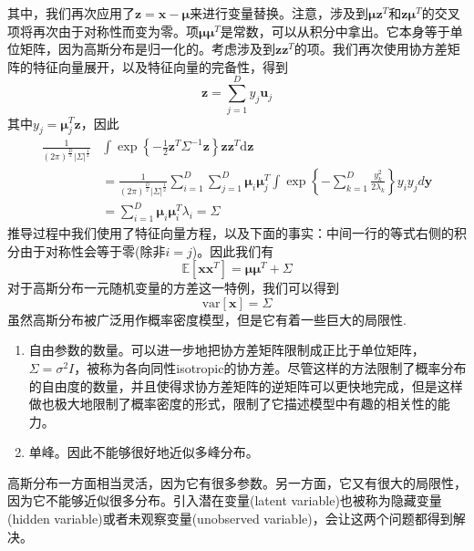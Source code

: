其中，我们再次应用了$\boldsymbol{z}=\boldsymbol{x}-\boldsymbol{\mu}$来进行变量替换。注意，涉及到$\boldsymbol{\mu z}^T$和$\boldsymbol{z\mu}^T$的交叉项将再次由于对称性而变为零。项$\boldsymbol{\mu \mu}^T$是常数，可以从积分中拿出。它本身等于单位矩阵，因为高斯分布是归一化的。考虑涉及到$\boldsymbol{zz}^T$的项。我们再次使用协方差矩阵的特征向量展开，以及特征向量的完备性，得到
\begin{equation}
	\boldsymbol{z}=\sum_{j=1}^{D}y_j\boldsymbol{u}_j
\end{equation}
其中$y_j=\boldsymbol{\mu}_j^T\boldsymbol{z}$，因此
\begin{equation}
\begin{aligned}
	\frac{1}{(2\pi)^{\frac{D}{2}}|\Sigma|^{\frac{1}{2}}}&\int\exp\left\{-\frac{1}{2}\boldsymbol{z}^T\Sigma^{-1}\boldsymbol{z} \right\}\boldsymbol{zz}^T\mathrm{d}\boldsymbol{z}\\
	&=\frac{1}{(2\pi)^{\frac{D}{2}}|\Sigma|^{\frac{1}{2}}}\sum_{i=1}^{D}\sum_{j=1}^{D}\boldsymbol{\mu}_i\boldsymbol{\mu}_j^T\int \exp\left\{-\sum_{k=1}^{D}\frac{y_k^2}{2\lambda_k} \right\}y_iy_jd\boldsymbol{y}\\
	&=\sum_{i=1}^{D}\boldsymbol{\mu}_i\boldsymbol{\mu}_i^T\lambda_i=\Sigma
\end{aligned}
\end{equation}
推导过程中我们使用了特征向量方程，以及下面的事实：中间一行的等式右侧的积分由于对称性会等于零(除非$i=j$)。因此我们有
\begin{equation}
	\mathbb{E}[\boldsymbol{xx}^T]=\boldsymbol{\mu\mu}^T+\Sigma
\end{equation}
对于高斯分布一元随机变量的方差这一特例，我们可以得到
\begin{equation}
	\mathrm{var}[\boldsymbol{x}]=\Sigma
\end{equation}
虽然高斯分布被广泛用作概率密度模型，但是它有着一些巨大的局限性.
\begin{enumerate}
	\item 自由参数的数量。可以进一步地把协方差矩阵限制成正比于单位矩阵，$\Sigma=\sigma^2I$，被称为各向同性isotropic的协方差。尽管这样的方法限制了概率分布的自由度的数量，并且使得求协方差矩阵的逆矩阵可以更快地完成，但是这样做也极大地限制了概率密度的形式，限制了它描述模型中有趣的相关性的能力。
	\item 单峰。因此不能够很好地近似多峰分布。
\end{enumerate}
高斯分布一方面相当灵活，因为它有很多参数。另一方面，它又有很大的局限性，因为它不能够近似很多分布。引入潜在变量(latent variable)也被称为隐藏变量(hidden variable)或者未观察变量(unobserved variable)，会让这两个问题都得到解决。
